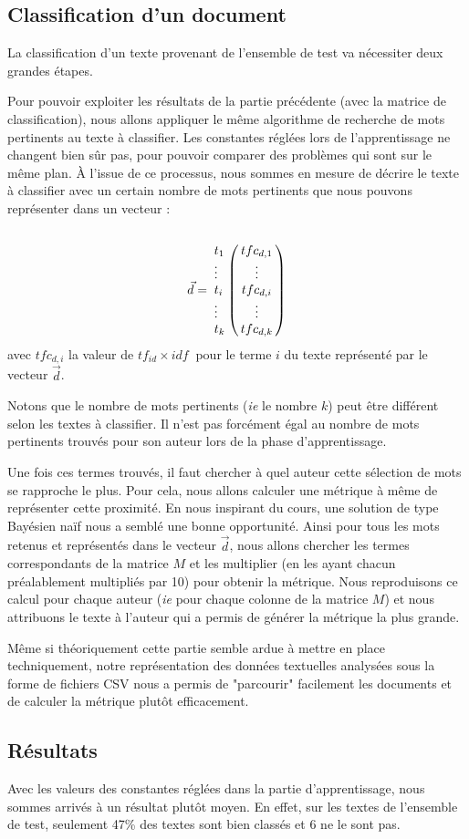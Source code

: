 \documentclass[a4paper,12pt]{report}
\begin{document}
\subsection{Classification d'un document}
La classification d'un texte provenant de l'ensemble de test va nécessiter deux grandes étapes. 

Pour pouvoir exploiter les résultats de la partie précédente (avec la matrice de classification), nous allons appliquer le même algorithme de recherche de mots pertinents au texte à classifier. Les constantes réglées lors de l'apprentissage ne changent bien sûr pas, pour pouvoir comparer des problèmes qui sont sur le même plan. À l'issue de ce processus, nous sommes en mesure de décrire le texte à classifier avec un certain nombre de mots pertinents que nous pouvons représenter dans un vecteur : 
\[
\vec{d}= \bordermatrix{
& \cr
t_{1} & tfc_{d,1} \cr
\vdots & \vdots \cr
t_{i} & tfc_{d,i} \cr
\vdots & \vdots \cr
t_{k} & tfc_{d,k} \cr
}
\]
avec $tfc_{d,i}$ la valeur de $tf_{id} \times idf\ $ pour le terme $i$ du texte représenté par le vecteur $\vec{d}$.

Notons que le nombre de mots pertinents (\textit{ie} le nombre $k$) peut être différent selon les textes à classifier. Il n'est pas forcément égal au nombre de mots pertinents trouvés pour son auteur lors de la phase d'apprentissage.

Une fois ces termes trouvés, il faut chercher à quel auteur cette sélection de mots se rapproche le plus. Pour cela, nous allons calculer une métrique à même de représenter cette proximité. En nous inspirant du cours, une solution de type Bayésien naïf nous a semblé une bonne opportunité. Ainsi pour tous les mots retenus et représentés dans le vecteur $\vec{d}$, nous allons chercher les termes correspondants de la matrice $M$ et les multiplier (en les ayant chacun préalablement multipliés par 10) pour obtenir la métrique. Nous reproduisons ce calcul pour chaque auteur (\textit{ie} pour chaque colonne de la matrice $M$) et nous attribuons le texte à l'auteur qui a permis de générer la métrique la plus grande.  

Même si théoriquement cette partie semble ardue à mettre en place techniquement, notre représentation des données textuelles analysées sous la forme de fichiers CSV nous a permis de "parcourir" facilement les documents et de calculer la métrique plutôt efficacement. 

\subsection{Résultats}
Avec les valeurs des constantes réglées dans la partie d'apprentissage, nous sommes arrivés à un résultat plutôt moyen. En effet, sur les textes de l'ensemble de test, seulement 47\% des textes sont bien classés et 6 ne le sont pas. 
\end{document}
